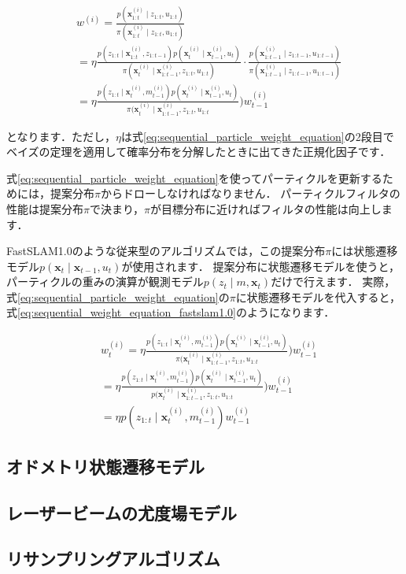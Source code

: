 \documentclass[{../../master}]{subfiles}
\begin{document}
\begin{equation}
  \begin{split}
    &w^{(i)} = \frac{p(\bm{x}_{1:t}^{(i)} \mid z_{1:t}, u_{1:t})}{\pi(\bm{x}_{1:t}^{(i)} \mid z_{1:t}, u_{1:t})} \\
    &= \eta \frac{p(z_{1:t} \mid \bm{x}_{1:t}^{(i)}, z_{1:t-1}) p(\bm{x}_{t}^{(i)} \mid \bm{x}_{t-1}^{(i)}, u_{t})}{\pi(\bm{x}_{t}^{(i)} \mid \bm{x}_{1:t-1}^{(i)}, z_{1:t}, u_{1:t})} \cdot \frac{p(\bm{x}_{1:t-1}^{(i)} \mid z_{1:t-1}, u_{1:t-1})}{\pi(\bm{x}_{1:t-1}^{(i)} \mid z_{1:t-1}, u_{1:t-1})} \\
    &= \eta \frac{p(z_{1:t} \mid \bm{x}_{t}^{(i)}, m_{t-1}^{(i)}) p(\bm{x}_{t}^{(i)} \mid \bm{x}_{t-1}^{(i)}, u_{t})}{\pi(\bm{x}_{t}^{(i)} \mid \bm{x}_{1:t-1}^{(i)}, z_{1:t}, u_{1:t}}) w_{t-1}^{(i)}
  \end{split}
  \label{eq:sequential_particle_weight_equation}
\end{equation}

\noindent
となります．ただし，$\eta$は式\ref{eq:sequential_particle_weight_equation}の2段目でベイズの定理を適用して確率分布を分解したときに出てきた正規化因子です．

式\ref{eq:sequential_particle_weight_equation}を使ってパーティクルを更新するためには，提案分布$\pi$からドローしなければなりません．
パーティクルフィルタの性能は提案分布$\pi$で決まり，$\pi$が目標分布に近ければフィルタの性能は向上します．

FastSLAM1.0のような従来型のアルゴリズムでは，この提案分布$\pi$には状態遷移モデル$p(\bm{x}_{t} \mid \bm{x}_{t-1}, u_{t})$が使用されます．
提案分布に状態遷移モデルを使うと，パーティクルの重みの演算が観測モデル$p(z_{t} \mid m, \bm{x}_{t})$だけで行えます．
実際，式\ref{eq:sequential_particle_weight_equation}の$\pi$に状態遷移モデルを代入すると，式\ref{eq:sequential_weight_equation_fastslam1.0}のようになります．

\begin{equation}
  \begin{split}
    &w_{t}^{(i)} = \eta \frac{p(z_{1:t} \mid \bm{x}_{t}^{(i)}, m_{t-1}^{(i)}) p(\bm{x}_{t}^{(i)} \mid \bm{x}_{t-1}^{(i)}, u_{t})}{\pi(\bm{x}_{t}^{(i)} \mid \bm{x}_{1:t-1}^{(i)}, z_{1:t}, u_{1:t}}) w_{t-1}^{(i)} \\
    &= \eta \frac{p(z_{1:t} \mid \bm{x}_{t}^{(i)}, m_{t-1}^{(i)}) p(\bm{x}_{t}^{(i)} \mid \bm{x}_{t-1}^{(i)}, u_{t})}{p(\bm{x}_{t}^{(i)} \mid \bm{x}_{1:t-1}^{(i)}, z_{1:t}, u_{1:t}}) w_{t-1}^{(i)} \\
    &= \eta p(z_{1:t} \mid \bm{x}_{t}^{(i)}, m_{t-1}^{(i)}) w_{t-1}^{(i)}
  \end{split}
  \label{eq:sequential_weight_equation_fastslam1.0}
\end{equation}

\subsection{オドメトリ状態遷移モデル}

\subsection{レーザービームの尤度場モデル}

\subsection{リサンプリングアルゴリズム}
\end{document}
